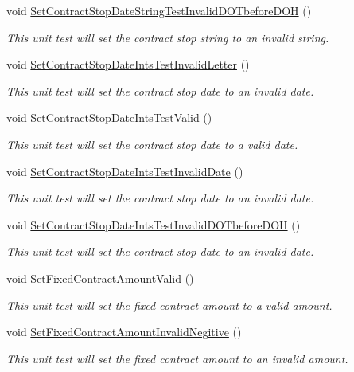 \begin{DoxyCompactItemize}
void \hyperlink{class_my_all_employee_1_1_tests_1_1_contract_employee_tests_ab173ae0ba70332b83f2a10850c843d7a}{Set\+Contract\+Stop\+Date\+String\+Test\+Invalid\+D\+O\+Tbefore\+D\+O\+H} ()
\begin{DoxyCompactList}\small\item\em This unit test will set the contract stop string to an invalid string. \end{DoxyCompactList}\item 
void \hyperlink{class_my_all_employee_1_1_tests_1_1_contract_employee_tests_a1a2d4cb08d5d86536f12baef54cb2b3f}{Set\+Contract\+Stop\+Date\+Ints\+Test\+Invalid\+Letter} ()
\begin{DoxyCompactList}\small\item\em This unit test will set the contract stop date to an invalid date. \end{DoxyCompactList}\item 
void \hyperlink{class_my_all_employee_1_1_tests_1_1_contract_employee_tests_a9447df2cc82ad42e0fc164ae88e636a8}{Set\+Contract\+Stop\+Date\+Ints\+Test\+Valid} ()
\begin{DoxyCompactList}\small\item\em This unit test will set the contract stop date to a valid date. \end{DoxyCompactList}\item 
void \hyperlink{class_my_all_employee_1_1_tests_1_1_contract_employee_tests_aaa29e10f49c00d0f89db08a20d1fed48}{Set\+Contract\+Stop\+Date\+Ints\+Test\+Invalid\+Date} ()
\begin{DoxyCompactList}\small\item\em This unit test will set the contract stop date to an invalid date. \end{DoxyCompactList}\item 
void \hyperlink{class_my_all_employee_1_1_tests_1_1_contract_employee_tests_a4666e65ccf384f5d65f237cbd7205cc3}{Set\+Contract\+Stop\+Date\+Ints\+Test\+Invalid\+D\+O\+Tbefore\+D\+O\+H} ()
\begin{DoxyCompactList}\small\item\em This unit test will set the contract stop date to an invalid date. \end{DoxyCompactList}\item 
void \hyperlink{class_my_all_employee_1_1_tests_1_1_contract_employee_tests_a21fdcffc82d7dd616880c6de426ea608}{Set\+Fixed\+Contract\+Amount\+Valid} ()
\begin{DoxyCompactList}\small\item\em This unit test will set the fixed contract amount to a valid amount. \end{DoxyCompactList}\item 
void \hyperlink{class_my_all_employee_1_1_tests_1_1_contract_employee_tests_adbd5c9282fccead325fa1f04de809ffd}{Set\+Fixed\+Contract\+Amount\+Invalid\+Negitive} ()
\begin{DoxyCompactList}\small\item\em This unit test will set the fixed contract amount to an invalid amount. \end{DoxyCompactList}\end{DoxyCompactItemize}


